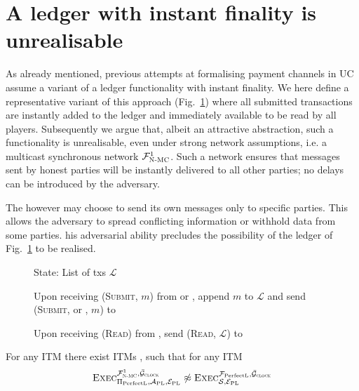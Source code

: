 \section{A ledger with instant finality is unrealisable}
\label{sec:perfect-ledger}
  As already mentioned, previous attempts at formalising payment channels in
  UC~\cite{DBLP:conf/ccs/DziembowskiFH18,Malavolta:2017:CPP:3133956.3134096,sprites,perun}
  assume a variant of a ledger functionality with instant finality. We here
  define a representative variant of this approach \perfectledger{}
  (Fig.~\ref{fig:perfectledger:func}) where all submitted transactions are
  instantly added to the ledger and immediately available to be read by all
  players. Subsequently we argue that, albeit an attractive abstraction, such a
  functionality is unrealisable, even under strong network assumptions, i.e. a
  multicast synchronous network $\mathcal{F}_{\textsc{N-MC}}^1$. Such a network ensures that
  messages sent by honest parties will be instantly delivered to all other
  parties; no delays can be introduced by the adversary. 

  The  however may choose to send its own messages only to
  specific parties. This allows the adversary to spread conflicting information
  or withhold data from some parties. his adversarial ability
  precludes the possibility of the ledger of Fig.~\ref{fig:perfectledger:func}
  to be realised.

  \begin{figure}[H]
    \begin{systembox}{\perfectledger}
      \begin{algorithmic}[1]
        \State State: List of txs $\mathcal{L}$
        \Statex

        \State Upon receiving (\textsc{Submit}, $m$) from \alice{} or
        \adversary, append $m$ to $\mathcal{L}$ and send (\textsc{Submit},
        \alice{} or \adversary, $m$) to \adversary
        \Statex

        \State Upon receiving (\textsc{Read}) from \alice, send (\textsc{Read},
        $\mathcal{L}$) to \alice
      \end{algorithmic}
    \end{systembox}
    \caption{}
    \label{fig:perfectledger:func}
  \end{figure}

  \begin{theorem}
    \label{theorem:perfectledger}
    For any ITM \perfectprot{} there exist ITMs \perfectenv,
    \perfectadv{} such that for any ITM \simulator
    \begin{equation*}
      \textsc{Exec}^{\FnetworkEd^1, \gFclock}_{\perfectprot,
      \redden{\perfectadv, \perfectenv}} \not\approx
      \textsc{Exec}^{\perfectledger, \gFclock}_{\simulator,
      \redden{\perfectenv}}
    \end{equation*}
  \end{theorem}

